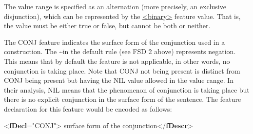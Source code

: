 The value range is specified as an alternation (more precisely, an exclusive disjunction), which can be represented by the \hyperref[TEI.binary]{<binary>} feature value. That is, the value must be either true or false, but cannot be both or neither.\par
The CONJ feature indicates the surface form of the conjunction used in a construction. The \textasciitilde  in the default rule (see FSD 2 above) represents negation. This means that by default the feature is not applicable, in other words, no conjunction is taking place. Note that CONJ not being present is distinct from CONJ being present but having the NIL value allowed in the value range. In their analysis, NIL means that the phenomenon of conjunction is taking place but there is no explicit conjunction in the surface form of the sentence. The feature declaration for this feature would be encoded as follows: \par\bgroup{}\exampleFont \begin{shaded}\noindent\mbox{}{<\textbf{fDecl}\hspace*{1em}{name}="{CONJ}">}\mbox{}\newline 
{}surface form of the conjunction{</\textbf{fDescr}>}\mbox{}\newline 
{}\mbox{}\newline 
\hspace*{1em}\mbox{}\newline 
\hspace*{1em}\hspace*{1em}\mbox{}\newline 

\end{shaded}

